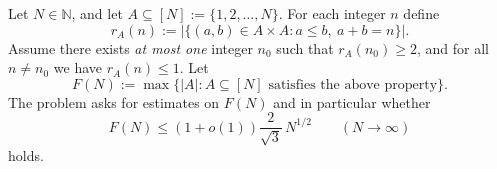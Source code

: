 Let $N\in\mathbb{N}$, and let $A\subseteq [N]:=\{1,2,\dots,N\}$.  For each integer $n$ define
\[
 r_A(n):=\bigl|\{(a,b)\in A\times A: a\le b,\ a+b=n\}\bigr|.
\]
Assume there exists \emph{at most one} integer $n_0$ such that $r_A(n_0)\ge 2$, and for all $n\ne n_0$ we have $r_A(n)\le 1$.  Let
\[
F(N):=\max\{|A|:A\subseteq [N]\text{ satisfies the above property}\}.
\]
The problem asks for estimates on $F(N)$ and in particular whether
\[
F(N)\le (1+o(1))\frac{2}{\sqrt 3}\,N^{1/2}\qquad (N\to\infty)
\]
holds.
